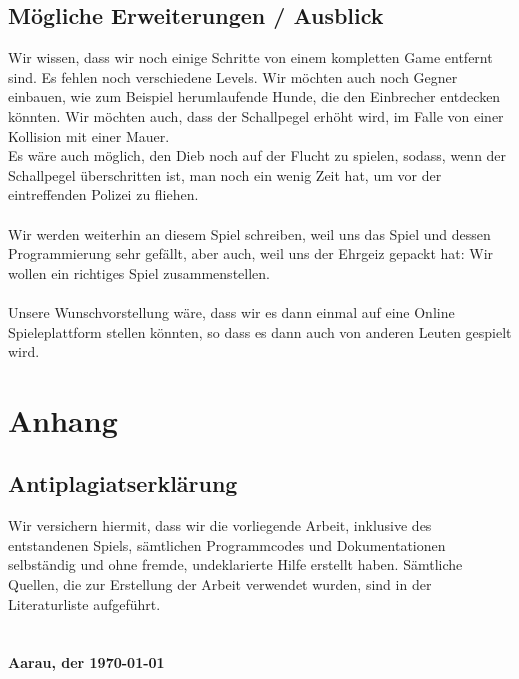 \documentclass[11pt,a4paper]{scrbook}
\begin{document}
\chapter{Mögliche Erweiterungen / Ausblick}
Wir wissen, dass wir noch einige Schritte von einem kompletten Game entfernt sind. Es fehlen noch verschiedene Levels. Wir möchten auch noch Gegner einbauen, wie zum Beispiel herumlaufende Hunde, die den Einbrecher entdecken könnten. Wir möchten auch, dass der Schallpegel erhöht wird, im Falle von einer Kollision mit einer Mauer.     
\\
Es wäre auch möglich, den Dieb noch auf der Flucht zu spielen, sodass, wenn der Schallpegel überschritten ist, man noch ein wenig Zeit hat, um vor der eintreffenden Polizei zu fliehen.
\\      
\\     
Wir werden weiterhin an diesem Spiel schreiben, weil uns das Spiel und dessen Programmierung sehr gefällt, aber auch, weil uns der Ehrgeiz gepackt hat: Wir wollen ein richtiges Spiel zusammenstellen.\\
\\
Unsere Wunschvorstellung wäre, dass wir es dann einmal auf eine Online Spieleplattform stellen könnten, so dass es dann auch von anderen Leuten gespielt wird.


\clearpage
\mbox{}\clearpage
{}
\part{Anhang}
\listoffigures

\clearpage

\printbibliography

\clearpage

\chapter*{Antiplagiatserklärung}
Wir versichern hiermit, dass wir die vorliegende Arbeit, inklusive des entstandenen Spiels, sämtlichen Programmcodes und Dokumentationen
selbständig und ohne fremde, undeklarierte Hilfe erstellt haben. Sämtliche Quellen, die zur Erstellung
der Arbeit verwendet wurden, sind in der Literaturliste aufgeführt.
\\\\\\
\textbf{Aarau, der \today}\\
\end{document}
